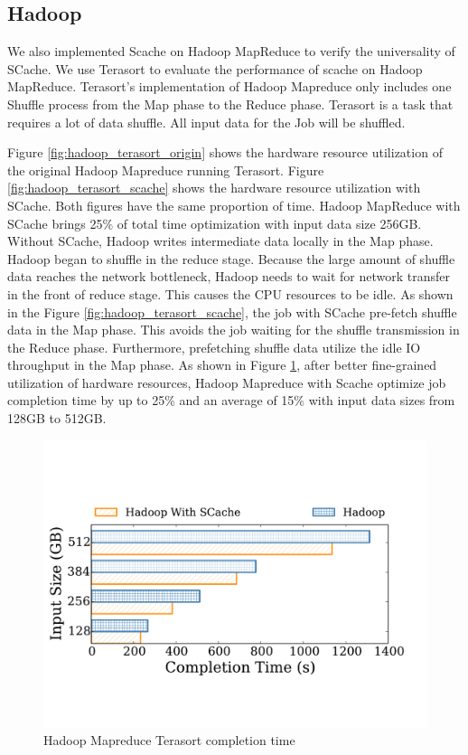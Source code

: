 {\color{blue}
\subsection{Hadoop}

We also implemented Scache on Hadoop MapReduce to verify the universality of SCache. We use Terasort to evaluate the performance of scache on Hadoop MapReduce. Terasort's implementation of Hadoop Mapreduce only includes one Shuffle process from the Map phase to the Reduce phase. Terasort is a task that requires a lot of data shuffle. All input data for the Job will be shuffled.

Figure \ref{fig:hadoop_terasort_origin} shows the hardware resource utilization of the original Hadoop Mapreduce running Terasort. Figure \ref{fig:hadoop_terasort_scache} shows the hardware resource utilization with SCache. Both figures have the same proportion of time. Hadoop MapReduce with SCache brings 25\% of total time optimization with input data size 256GB. Without SCache, Hadoop writes intermediate data locally in the Map phase. Hadoop began to shuffle in the reduce stage. Because the large amount of shuffle data reaches the network bottleneck, Hadoop needs to wait for network transfer in the front of reduce stage. This causes the CPU resources to be idle. As shown in the Figure \ref{fig:hadoop_terasort_scache}, the job with SCache pre-fetch shuffle data in the Map phase. This avoids the job waiting for the shuffle transmission in the Reduce phase. Furthermore, prefetching shuffle data utilize the idle IO throughput in the Map phase. As shown in Figure \ref{fig:hadoop_terasort_time}, after better fine-grained utilization of hardware resources, Hadoop Mapreduce with Scache optimize job completion time by up to 25\% and an average of 15\% with input data sizes from 128GB to 512GB.
}

\begin{figure}
	\includegraphics[width=\linewidth]{fig/hadoop_terasort_time}
	\caption{\color{blue}Hadoop Mapreduce Terasort completion time}
	\label{fig:hadoop_terasort_time}
\end{figure}

